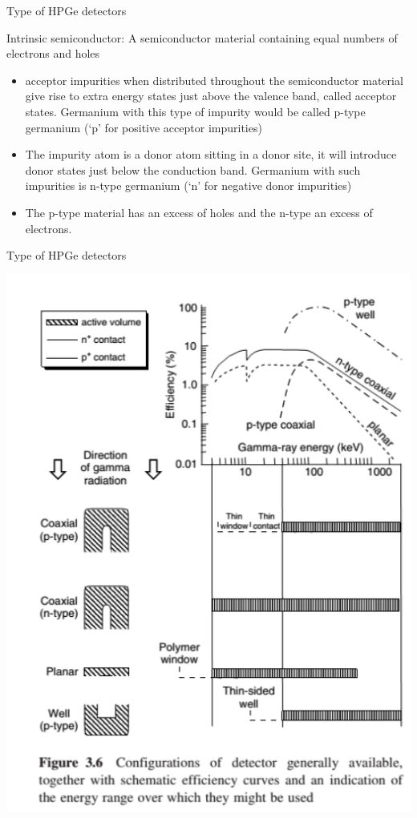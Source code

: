 \begin{frame}{Type of HPGe detectors}

\alert{Intrinsic semiconductor: A semiconductor material containing equal numbers of electrons and holes}

\begin{exampleblock}{}
{\small
\begin{itemize}
\item acceptor impurities when distributed throughout the semiconductor material give rise to extra energy states just above the valence band, called acceptor states. Germanium with this type of impurity would be called p-type germanium (‘p’ for positive acceptor impurities) 
\item The impurity atom is a donor atom sitting in a donor site, it will introduce donor states just below the conduction band. Germanium with such impurities is n-type germanium (‘n’ for negative donor impurities)
\item The p-type material has an excess of holes and the n-type an excess of electrons.
\end{itemize}
}
\end{exampleblock}


\end{frame}

\begin{frame}{Type of HPGe detectors}

\centering
\includegraphics[scale=0.3]{figures/typehpge.png}

\end{frame}

